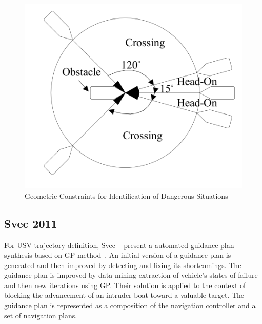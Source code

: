     \begin{figure}[H]
        \centering
        \includegraphics[scale=0.4]{figs/Chap3/Zhuang2011Motion_Sectors.png}
        \caption{Geometric Constraints for Identification of Dangerous Situations \cite{Zhuang2011Motion}}
        \label{fig:Zhuang2011Motion_Sectors}
    \end{figure}
    
    \subsection{Svec 2011}
    For \ac{USV} trajectory definition, Svec \etal~\cite{Svec2011aAutomated, Svec2012Automated} present a automated guidance plan synthesis based on \ac{GP} method~\cite{Russel2003AI_GA}.
    An initial version of a guidance plan is generated and then improved by detecting and fixing its shortcomings. The guidance plan is improved by data mining extraction of vehicle's states of failure and then new iterations using \ac{GP}. Their solution is applied to the context of blocking the advancement of an intruder boat toward a valuable target. The guidance plan is represented as a composition of the navigation controller and a set of navigation plans.
    
